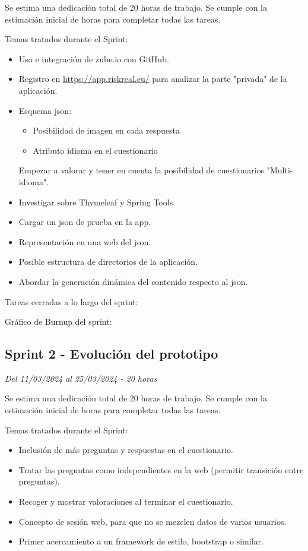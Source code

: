 Se estima una dedicación total de 20 horas de trabajo.
Se cumple con la estimación inicial de horas para completar todas las tareas.

Temas tratados durante el Sprint:

\begin{itemize}
	\item
	Uso e integración de zube.io con GitHub.
	\item
	Registro en \url{https://app.riskreal.eu/} para analizar la parte "privada" de la aplicación.
	\item
	Esquema json:
	\begin{itemize}
		\item
		Posibilidad de imagen en cada respuesta
		\item
		Atributo idioma en el cuestionario
	\end{itemize}
	Empezar a valorar y tener en cuenta la posibilidad de cuestionarios "Multi-idioma".
	\item
	Investigar sobre Thymeleaf y Spring Tools.
	\item
	Cargar un json de prueba en la app.
	\item
	Representación en una web del json.
	\item
	Posible estructura de directorios de la aplicación.
	\item
	Abordar la generación dinámica del contenido respecto al json.
\end{itemize}

Tareas  cerradas a lo largo del sprint:

Gráfico de Burnup del sprint:


\subsection{Sprint 2 - Evolución del prototipo}
\textit{Del 11/03/2024 al 25/03/2024 - 20 horas}

Se estima una dedicación total de 20 horas de trabajo.
Se cumple con la estimación inicial de horas para completar todas las tareas.

Temas tratados durante el Sprint:

\begin{itemize}
	\item
	Inclusión de más preguntas y respuestas en el cuestionario.
	\item
	Tratar las preguntas como independientes en la web (permitir transición entre preguntas).
	\item
	Recoger y mostrar valoraciones al terminar el cuestionario.
	\item
	Concepto de sesión web, para que no se mezclen datos de varios usuarios.
	\item
	Primer acercamiento a un framework de estilo, bootstrap o similar.
\end{itemize}

